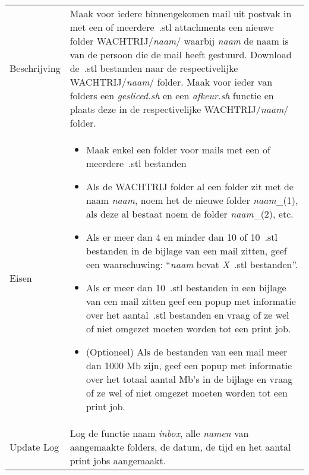 \documentclass{article}
\newcommand{\quotes}[1]{``#1''}
\begin{document}
\begin{table}[H]
    \centering
    \begin{tabular}%
    {>{\raggedright\arraybackslash}p{}%
    |>{\raggedright\arraybackslash}p{}}
    \rowcolor{myblue}\multicolumn{2}{c}{\rule{0pt}{13pt}Functie: {\Large \textit{inbox.sh}}}\\\hline
    Beschrijving & 
    Maak voor iedere binnengekomen mail uit postvak in met een of meerdere~.stl attachments een nieuwe folder WACHTRIJ/\textit{naam}/ waarbij \textit{naam} de naam is van de persoon die de mail heeft gestuurd. Download de~.stl bestanden naar de respectivelijke WACHTRIJ/\textit{naam}/ folder. Maak voor ieder van folders een \textit{gesliced.sh} en een \textit{afkeur.sh} functie en plaats deze in de respectivelijke WACHTRIJ/\textit{naam}/ folder.\\
  Eisen & 
\begin{itemize} 
\item Maak enkel een folder voor mails met een of meerdere~.stl bestanden
\item Als de WACHTRIJ folder al een folder zit met de naam \textit{naam}, noem het de nieuwe folder \textit{naam}\_(1), als deze al bestaat noem de folder \textit{naam}\_(2), etc.
\item Als er meer dan 4 en minder dan 10 of 10~.stl bestanden in de bijlage van een mail zitten, geef een waarschuwing: \quotes{\textit{naam} bevat \textit{X}~.stl bestanden}.
\item Als er meer dan 10~.stl bestanden in een bijlage van een mail zitten geef een popup met informatie over het aantal~.stl bestanden en vraag of ze wel of niet omgezet moeten worden tot een print job. 
\item (Optioneel) Als de bestanden van een mail meer dan 1000 Mb zijn, geef een popup met informatie over het totaal aantal Mb's in de bijlage en vraag of ze wel of niet omgezet moeten worden tot een print job. 
\end{itemize} \\
  Update Log& Log de functie naam \textit{inbox}, alle \textit{namen} van aangemaakte folders, de datum, de tijd en het aantal print jobs aangemaakt.\\
    \end{tabular}
\end{table}
\end{document}
